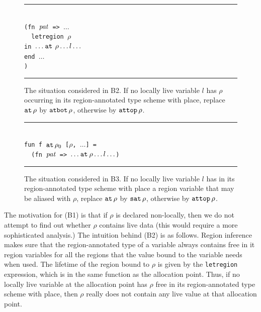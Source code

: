 \documentclass[12pt]{book}
\begin{document}
\begin{figure}
\hrule
\begin{center}
\begin{tabbing}
\\
\hskip3cm\=\tt (fn ${\it pat}$ => $\ldots$\\
       \>\ \ \=\tt letregion $\rho$ \\
       \>    \>\tt in  $\ldots\mathbin{\hbox{\tt at}}\,\rho\ldots l \ldots$\\
       \>    \>\tt end $\ldots$\\
       \>\tt )
\end{tabbing}
\end{center}
\caption{The situation considered in B2. If no locally live variable
  $l$ has $\rho$ occurring in its region-annotated type scheme with place, replace
  $\mathbin{\hbox{\tt at}}\,\rho$ by $\hbox{\tt atbot}\,\rho$, otherwise by $\hbox{\tt attop}\,\rho$.}
\medskip
\hrule
\label{b2.fig}
\end{figure}

\begin{figure}
\hrule
\begin{center}
\begin{tabbing}
\\
\hskip3cm\=\tt fun f $\mathbin{\hbox{\tt at}}\,\rho_0$ [$\rho$, $\ldots$] = \\
         \>\tt \ \ \=\tt (fn ${\it pat}$ => $\ldots\mathbin{\hbox{\tt at}}\rho\ldots l\ldots$)
\end{tabbing}
\end{center}
\caption{The situation considered in B3. If no locally live variable
  $l$ has in its region-annotated type scheme with place a region variable that may be
  aliased with $\rho$, replace $\mathbin{\hbox{\tt at}}\,\rho$ by $\hbox{\tt sat}\,\rho$, otherwise
  by $\hbox{\tt attop}\,\rho$.}  
\medskip
\hrule
\label{b3.fig}
\end{figure}
The motivation for (B1) is that if $\rho$ is declared non-locally,
then we do not attempt to find out whether $\rho$ contains live data (this would
require a more sophisticated analysis.) 
The intuition behind (B2) is as follows. Region inference
makes sure that the region-annotated type of a variable always contains
free in it region variables for all the regions that the value bound to the
variable needs when used. The lifetime of the region bound to 
$\rho$ is given by the {\tt letregion} expression, which is in the same function
as the allocation point. Thus,  
if no locally live variable at the allocation point
has $\rho$ free in its region-annotated type scheme with place,
then $\rho$ really does not contain any
live value at that allocation point.
\end{document}
